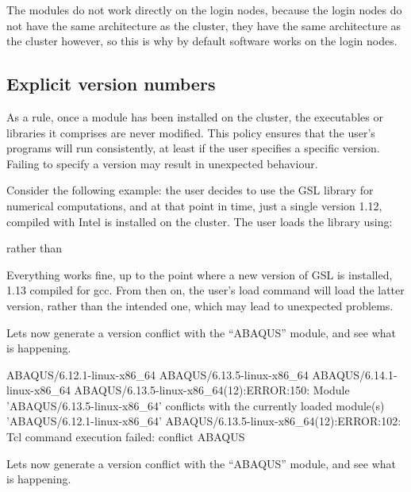 The \othercluster modules do not work directly on the login nodes, because the
login nodes do not have the same architecture as the \othercluster cluster, they
have the same architecture as the  cluster however, so this is why
by default software works on the login nodes.

\begin{prompt}
\end{prompt}

\fi

\subsection{Explicit version numbers}

As a rule, once a module has been installed on the cluster, the executables or
libraries it comprises are never modified. This policy ensures that the user's
programs will run consistently, at least if the user specifies a specific
version. Failing to specify a version may result in unexpected behaviour.

Consider the following example: the user decides to use the GSL library for
numerical computations, and at that point in time, just a single version 1.12,
compiled with Intel is installed on the cluster. The user loads the library
using:

\begin{prompt}
\end{prompt}

rather than

\begin{prompt}
\end{prompt}

Everything works fine, up to the point where a new version of GSL is installed,
1.13 compiled for gcc. From then on, the user's load command will load the
latter version, rather than the intended one, which may lead to unexpected
problems.

\ifantwerpen
Lets now generate a version conflict with the ``ABAQUS'' module, and see what
is happening.

\begin{prompt}
ABAQUS/6.12.1-linux-x86_64
ABAQUS/6.13.5-linux-x86_64
ABAQUS/6.14.1-linux-x86_64
ABAQUS/6.13.5-linux-x86_64(12):ERROR:150: Module 'ABAQUS/6.13.5-linux-x86_64' conflicts with the currently loaded module(s) 'ABAQUS/6.12.1-linux-x86_64'
ABAQUS/6.13.5-linux-x86_64(12):ERROR:102: Tcl command execution failed: conflict ABAQUS
\end{prompt}
\fi
\ifgent
Lets now generate a version conflict with the ``ABAQUS'' module, and see what
is happening.


